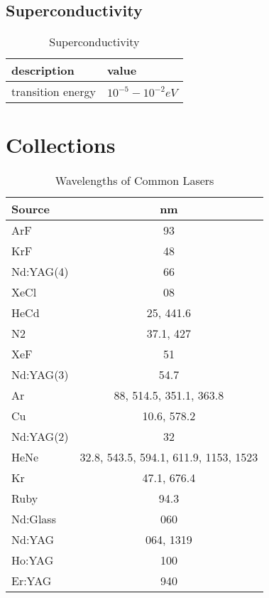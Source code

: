\subsection{Superconductivity}
\begin{table}[h]
    \centering
    \caption{Superconductivity}
    \label{tab:superconductivity}
    \begin{tabular}{l | l}
	\hline
	description &	value	\\
	\hline
	transition energy   & $10^{-5}-10^{-2} eV$  \\
	\hline
    \end{tabular}
\end{table}
\section{Collections}

\newpage
\begin{table}
    \caption{Wavelengths of Common Lasers}
    \label{tab:common_lasers}
    \begin{center}
	\begin{tabular}{l|c}
	    \hline
	    Source	& nm	\\
	    \hline
	    ArF	& 93	\\
	    \hline
	    KrF	& 48	\\
	    \hline
	    Nd:YAG(4)	& 66	\\
	    \hline
	    XeCl	& 08	\\
	    \hline
	    HeCd	& 25, 441.6	\\
	    \hline
	    N2	& 37.1, 427	\\
	    \hline
	    XeF	& 51	\\
	    \hline
	    Nd:YAG(3)	& 54.7	\\
	    \hline
	    Ar	& 88, 514.5, 351.1, 363.8	\\
	    \hline
	    Cu	& 10.6, 578.2	\\
	    \hline
	    Nd:YAG(2)	& 32	\\
	    \hline
	    HeNe	& 32.8, 543.5, 594.1, 611.9, 1153, 1523	\\
	    \hline
	    Kr	& 47.1, 676.4	\\
	    \hline
	    Ruby	& 94.3	\\
	    \hline
	    Nd:Glass	& 060	\\
	    \hline
	    Nd:YAG	& 064, 1319	\\
	    \hline
	    Ho:YAG	& 100	\\
	    \hline
	    Er:YAG	& 940	\\
	    \hline
	\end{tabular}
    \end{center}
\end{table}

\renewcommand{\arraystretch}{1}

